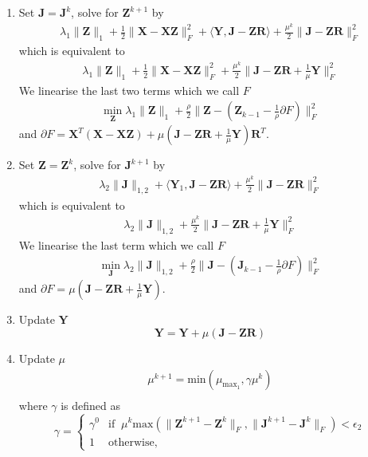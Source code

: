 \documentclass{article}
\begin{document}
\begin{enumerate}

\item Set $\mathbf J = \mathbf J^k$, solve for $\mathbf Z^{k+1}$ by
\begin{align*}
\lambda_1 \|\mathbf Z\|_{1} + \frac12\|\mathbf X - \mathbf X\mathbf Z\|^2_F + \langle \mathbf Y, \mathbf J - \mathbf Z\mathbf R\rangle +\frac{\mu^k}2\|\mathbf J - \mathbf Z\mathbf R\|^2_F 
\end{align*}
which is equivalent to
\begin{align*}
\lambda_1 \|\mathbf Z\|_{1} + \frac12\|\mathbf X - \mathbf X\mathbf Z\|^2_F + \frac{\mu^k}2\|\mathbf J - \mathbf Z\mathbf R + \frac{1}{\mu} \mathbf Y \|^2_F
\end{align*}
We linearise the last two terms which we call $F$
\begin{align*}
\min_{\mathbf Z} \lambda_1 \| \mathbf Z \|_1 + \frac{\rho}{2} \| \mathbf Z - (\mathbf Z_{k-1} - \frac{1}{\rho} \partial F) \|_F^2
\end{align*}
and $\partial F = \mathbf X^T(\mathbf{X - XZ}) + \mu (\mathbf J - \mathbf Z\mathbf R + \frac{1}{\mu} \mathbf Y)\mathbf R^T$.

\item Set $\mathbf Z = \mathbf Z^k$, solve for $\mathbf J^{k+1}$ by
\begin{align*}
\lambda_2\|\mathbf J\|_{1,2} + \langle \mathbf Y_1, \mathbf J - \mathbf Z\mathbf R\rangle +\frac{\mu^k}2\|\mathbf J - \mathbf Z\mathbf R\|^2_F 
\end{align*}
which is equivalent to
\begin{align*}
\lambda_2\|\mathbf J\|_{1,2} + \frac{\mu^k}2\|\mathbf J - \mathbf Z\mathbf R + \frac{1}{\mu} \mathbf Y \|^2_F
\end{align*}
We linearise the last term which we call $F$
\begin{align*}
\min_{\mathbf J} \lambda_2\|\mathbf J\|_{1,2}+ \frac{\rho}{2} \| \mathbf J - (\mathbf J_{k-1} - \frac{1}{\rho} \partial F) \|_F^2
\end{align*}
and $\partial F = \mu (\mathbf J - \mathbf Z\mathbf R + \frac{1}{\mu} \mathbf Y)$.

\item Update $\mathbf Y$
\[
\mathbf Y = \mathbf Y + \mu (\mathbf J - \mathbf Z\mathbf R)
\]

\item Update $\mu$
\begin{align*}
 \mu^{k+1} = \textrm{min}( \mu_{\text{max}_1}, \gamma \mu^k)\\
\end{align*}
where $\gamma$ is defined as
\[
\gamma = 
\begin{cases}
\gamma^0 & \text{if} \;\; \mu^k \textrm{max} ( \| \mathbf Z^{k+1} - \mathbf Z^{k}  \|_F  , \|  \mathbf J^{k+1} - \mathbf J^{k} \|_F) < \epsilon_2 \\
1 & \text{otherwise,}
\end{cases}
\]


\end{enumerate}
\end{document}
